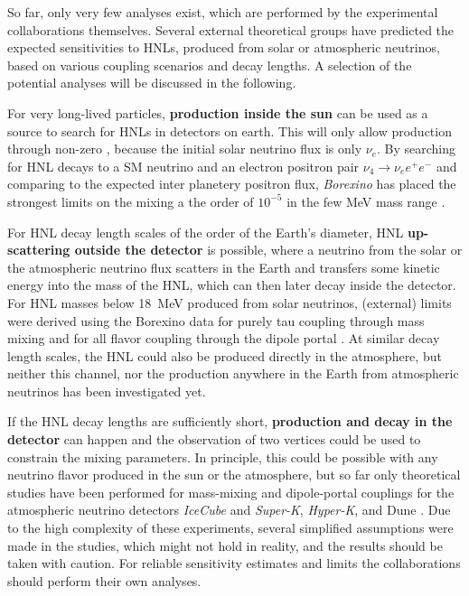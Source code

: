 So far, only very few analyses exist, which are performed by the experimental collaborations themselves. Several external theoretical groups have predicted the expected sensitivities to HNLs, produced from solar or atmospheric neutrinos, based on various coupling scenarios and decay lengths. A selection of the potential analyses will be discussed in the following.

For very long-lived particles, \textbf{production inside the sun} can be used as a source to search for HNLs in detectors on earth. This will only allow production through non-zero , because the initial solar neutrino flux is only $\nu_e$. By searching for HNL decays to a SM neutrino and an electron positron pair $\nu_4 \rightarrow \nu_e e^+ e^-$ and comparing to the expected inter planetery positron flux, \textit{Borexino} has placed the strongest limits on the mixing  a the order of $10^{-5}$ in the few \si{\mega\electronvolt} mass range .

For HNL decay length scales of the order of the Earth's diameter, HNL \textbf{up-scattering outside the detector} is possible, where a neutrino from the solar or the atmospheric neutrino flux scatters in the Earth and transfers some kinetic energy into the mass of the HNL, which can then later decay inside the detector. For HNL masses below \SI{18}{\mega\electronvolt} produced from solar neutrinos, (external) limits were derived using the Borexino data for purely tau coupling through mass mixing  and for all flavor coupling through the dipole portal . At similar decay length scales, the HNL could also be produced directly in the atmosphere, but neither this channel, nor the production anywhere in the Earth from atmospheric neutrinos has been investigated yet.

If the HNL decay lengths are sufficiently short, \textbf{production and decay in the detector} can happen and the observation of two vertices could be used to constrain the mixing parameters. In principle, this could be possible with any neutrino flavor produced in the sun or the atmosphere, but so far only theoretical studies have been performed for mass-mixing and dipole-portal couplings for the atmospheric neutrino detectors \textit{IceCube}  and \textit{Super-K}, \textit{Hyper-K}, and Dune . Due to the high complexity of these experiments, several simplified assumptions were made in the studies, which might not hold in reality, and the results should be taken with caution. For reliable sensitivity estimates and limits the collaborations should perform their own analyses.


